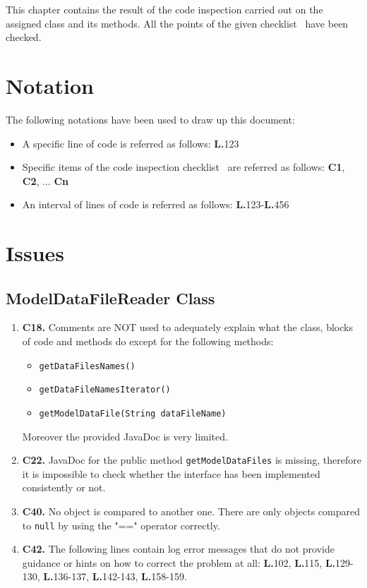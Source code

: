 This chapter contains the result of the code inspection carried out on the assigned class and its methods. All the points of the given checklist~\cite{assignment} have been checked.
\section{Notation}
The following notations have been used to draw up this document:
\begin{itemize}
\item A specific line of code is referred as follows: \textbf{L.}123
\item Specific items of the code inspection checklist~\cite{assignment} are referred as follows: \textbf{C1}, \textbf{C2}, ... \textbf{Cn}
\item An interval of lines of code is referred as follows: \textbf{L.}123-\textbf{L.}456
\end{itemize}

\section{Issues}
\subsection{ModelDataFileReader Class}
\begin{enumerate}
\item \textbf{C18.} Comments are NOT used to adequately explain what the class, blocks of code and methods do except for the following methods:
	\begin{itemize}
	\item \texttt{getDataFilesNames()}
	\item \texttt{getDataFileNamesIterator()}
	\item \texttt{getModelDataFile(String dataFileName)}
	\end{itemize}
	Moreover the provided JavaDoc is very limited.
\item \textbf{C22.} JavaDoc for the public method \texttt{getModelDataFiles} is missing, therefore it is impossible to check whether the interface has been implemented consistently or not.
\item \textbf{C40.} No object is compared to another one. There are only objects compared to \texttt{null} by using the "==" operator correctly.
\item \textbf{C42.} The following lines contain log error messages that do not provide guidance or hints on how to correct the problem at all: \textbf{L.}102, \textbf{L.}115, \textbf{L.}129-130, \textbf{L.}136-137, \textbf{L.}142-143, \textbf{L.}158-159.
\end{enumerate}


